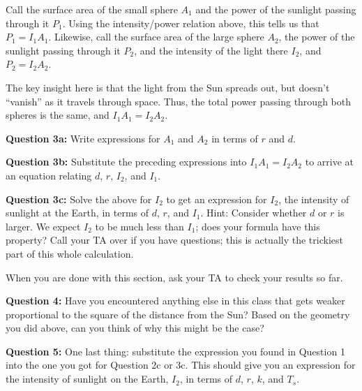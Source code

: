 \documentclass[11pt]{article}
\begin{document}
Call the surface area of the small sphere $A_1$ and the power of the sunlight passing through it $P_1$. Using the intensity/power 
relation above, this tells us that $P_1=I_1 A_1$. Likewise, call the surface area of the large sphere $A_2$, the power of the 
sunlight passing through it $P_2$, and the intensity of the light there $I_2$, and $P_2 = I_2 A_2$.

The key insight here is that the light from the Sun spreads out, but doesn't ``vanish'' as it travels through space. Thus,
the total power passing through both spheres is the same, and $I_1 A_1 = I_2 A_2$.

{\bf Question 3a:} Write expressions for $A_1$ and $A_2$ in terms of $r$ and $d$.

\vspace*{5cm}

\hrulefill


{\bf Question 3b:} Substitute the preceding expressions into $I_1 A_1 = I_2 A_2$ to arrive at an equation relating $d$, $r$,
$I_2$, and $I_1$.

\vspace*{5cm}

\hrulefill

{\bf Question 3c:} Solve the above for $I_2$ to get an expression for $I_2$, the intensity of sunlight at the Earth, in terms of
$d$, $r$, and $I_1$.
Hint: Consider whether $d$ or $r$ is larger.
We expect $I_2$ to be much less than $I_1$; does your formula have this property? Call your TA over if you have questions; this is actually the trickiest part of this whole calculation.
\vspace*{4cm}

\hrulefill




When you are done with this section, ask your TA to check your results so far.





\bigskip
\bigskip

{\bf Question 4:} Have you encountered anything else in this class that gets weaker proportional to the square of the distance from the Sun? Based on the geometry you did above, can you
think of why this might be the case?

\vspace*{4cm}

\hrulefill

{\bf Question 5:} One last thing: substitute the expression you found in Question 1 into the one you got for Question 2c or 3c. This should give you an expression for the intensity of
sunlight on the Earth, $I_2$, in terms of $d$, $r$, $k$, and $T_s$.
\end{document}
